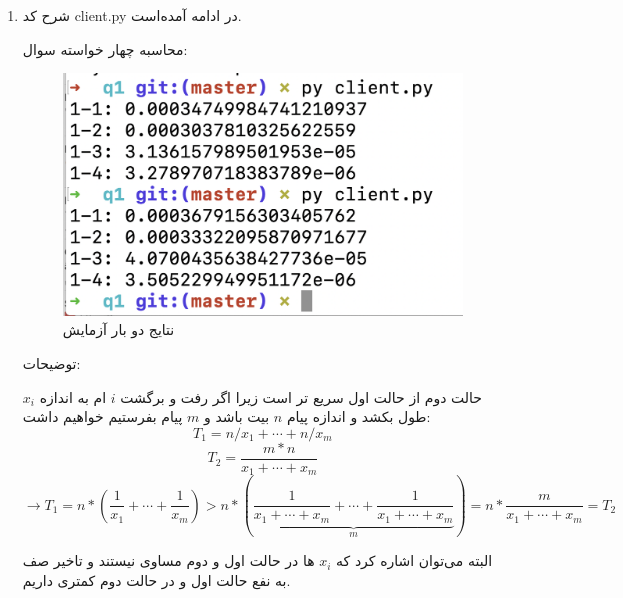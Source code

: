\documentclass[11pt]{article}
\begin{document}

	\begin{enumerate}[leftmargin=0.26in, font=\huge\bfseries]
		\item %
		شرح کد client.py در ادامه آمده‌است.
	
	محاسبه چهار خواسته سوال:
		\begin{latin}
			
		\end{latin}
		
	
	\begin{figure}
  \includegraphics[width=\linewidth]{Screen Shot 1400-01-22 at 18.51.12.png}
  \caption{نتایج دو بار آزمایش}
  \label{fig:screenshot}
\end{figure}


توضیحات:

حالت دوم از حالت اول سریع تر است زیرا اگر رفت و برگشت $i$ ام به اندازه $x_i$
طول بکشد و اندازه پیام $n$ بیت باشد و $m$ پیام بفرستیم خواهیم داشت:
\begin{equation*}
	T_1 = n/x_1 + \cdots + n/x_m 
\end{equation*}
\begin{equation*}
	T_2 = \frac{m*n}{x_1 + \cdots + x_m}	
\end{equation*}
\begin{equation*}
	\rightarrow T_1 = n*(\frac{1}{x_1} + \cdots + \frac{1}{x_m})
	> n* (\underbrace{\frac{1}{x_1 + \cdots + x_m} + \cdots + \frac{1}{x_1 + \cdots + x_m}}_{m}) = n* \frac{m}{x_1 + \cdots + x_m} = T_2
\end{equation*}

البته می‌توان اشاره کرد که $x_i$ ها در حالت‌ اول و دوم مساوی نیستند و تاخیر صف به نفع حالت اول و در حالت دوم
کمتری داریم.


\end{enumerate}
\end{document}
